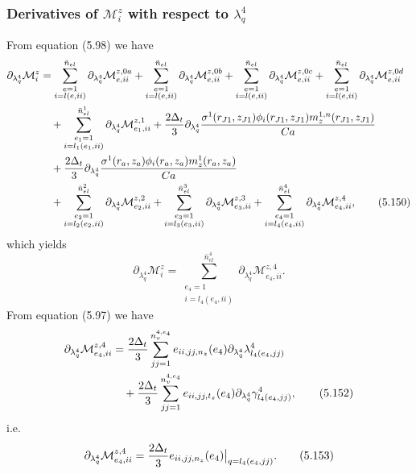 \documentclass{article}
\begin{document}
\subsubsection{Derivatives of $\mathcal{M}_i^z$ with respect to $\lambda_q^4$} %
From equation (5.98) we have
\begin{align}
\partial_{\lambda_q^4}\mathcal{M}_i^z &= \sum_{\substack{e=1\\ i=l(e,ii)}}^{\bar{n}_{el}} \partial_{\lambda_q^4} \mathcal{M}_{e,ii}^{z,0a} + \sum_{\substack{e=1\\ i=l(e,ii)}}^{\bar{n}_{el}} \partial_{\lambda_q^4} \mathcal{M}_{e,ii}^{z,0b} + \sum_{\substack{e=1\\ i=l(e,ii)}}^{\bar{n}_{el}} \partial_{\lambda_q^4} \mathcal{M}_{e,ii}^{z,0c} + \sum_{\substack{e=1\\ i=l(e,ii)}}^{\bar{n}_{el}} \partial_{\lambda_q^4} \mathcal{M}_{e,ii}^{z,0d} \nonumber\\
&\quad + \sum_{\substack{e_1=1\\ i=l_1(e_1,ii)}}^{\bar{n}_{el}^1} \partial_{\lambda_q^4} \mathcal{M}_{e_1,ii}^{z,1} + \frac{2\Delta_t}{3} \partial_{\lambda_q^4} \frac{\sigma^1(r_{J1},z_{J1}) \phi_i(r_{J1},z_{J1}) m_z^{1,n}(r_{J1},z_{J1})}{Ca} \nonumber\\
&\quad + \frac{2\Delta_t}{3} \partial_{\lambda_q^4} \frac{\sigma^1(r_a,z_a) \phi_i(r_a,z_a) m_z^{1}(r_a,z_a)}{Ca} \nonumber\\
&\quad + \sum_{\substack{e_2=1\\ i=l_2(e_2,ii)}}^{\bar{n}_{el}^2} \partial_{\lambda_q^4} \mathcal{M}_{e_2,ii}^{z,2} + \sum_{\substack{e_3=1\\ i=l_3(e_3,ii)}}^{\bar{n}_{el}^3} \partial_{\lambda_q^4} \mathcal{M}_{e_3,ii}^{z,3} + \sum_{\substack{e_4=1\\ i=l_4(e_4,ii)}}^{\bar{n}_{el}^4} \partial_{\lambda_q^4} \mathcal{M}_{e_4,ii}^{z,4}, \tag{5.150}
\end{align}
which yields
\begin{equation}
\partial_{\lambda_q^4}\mathcal{M}_i^z = \sum_{\substack{e_4=1\\ i=l_4(e_4,ii)}}^{\bar{n}_{el}^4} \partial_{\lambda_q^4} \mathcal{M}_{e_4,ii}^{z,4}. \tag{5.151}
\end{equation}
From equation (5.97) we have
\begin{align}
\partial_{\lambda_q^4}\mathcal{M}_{e_4,ii}^{z,4} &= \frac{2\Delta_t}{3} \sum_{jj=1}^{n_v^{4,e_4}} e_{ii,jj,n_z}(e_4) \partial_{\lambda_q^4} \lambda_{l_4(e_4,jj)}^4 \nonumber\\
&\quad + \frac{2\Delta_t}{3} \sum_{jj=1}^{n_v^{4,e_4}} e_{ii,jj,t_z}(e_4) \partial_{\lambda_q^4} \gamma_{l_4(e_4,jj)}^4, \tag{5.152}
\end{align}
i.e.
\begin{equation}
\partial_{\lambda_q^4}\mathcal{M}_{e_4,ii}^{z,4} = \frac{2\Delta_t}{3} e_{ii,jj,n_z}(e_4) \big|_{q=l_4(e_4,jj)}. \tag{5.153}
\end{equation}
\end{document}
